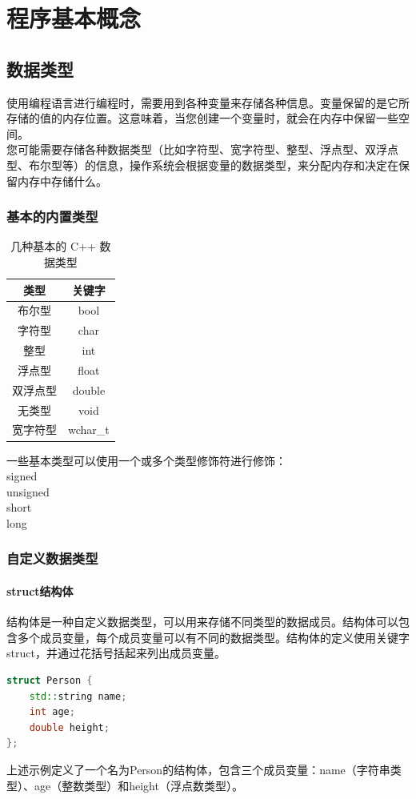 \documentclass[12pt,twiside,a4paper]{ctexbook}
\numberwithin{chapter}{part}
\begin{document}
\chapter{程序基本概念}
\section{数据类型}
使用编程语言进行编程时，需要用到各种变量来存储各种信息。变量保留的是它所存储的值的内存位置。这意味着，当您创建一个变量时，就会在内存中保留一些空间。\\
您可能需要存储各种数据类型（比如字符型、宽字符型、整型、浮点型、双浮点型、布尔型等）的信息，操作系统会根据变量的数据类型，来分配内存和决定在保留内存中存储什么。

\subsection{基本的内置类型}
\begin{table}[h]
    \centering
    \caption{几种基本的 C++ 数据类型}
    \label{tab:example}
    \begin{tabular}{|c|c|}
    \hline
    \textbf{类型} & \textbf{关键字}\\
    \hline
    布尔型 & bool\\
    \hline
    字符型 & char\\
    \hline
    整型 & int\\
    \hline
    浮点型 & float\\
    \hline
    双浮点型 & double\\
    \hline
    无类型 & void\\
    \hline
    宽字符型 & wchar\_t\\
    \hline
    \end{tabular}
\end{table}
一些基本类型可以使用一个或多个类型修饰符进行修饰：\\
signed\\
unsigned\\
short\\
long

\subsection{自定义数据类型}
\subsubsection{struct结构体}
结构体是一种自定义数据类型，可以用来存储不同类型的数据成员。结构体可以包含多个成员变量，每个成员变量可以有不同的数据类型。结构体的定义使用关键字struct，并通过花括号括起来列出成员变量。
\begin{lstlisting}[language=C++]
struct Person {
    std::string name;
    int age;
    double height;
};
\end{lstlisting}
上述示例定义了一个名为Person的结构体，包含三个成员变量：name（字符串类型）、age（整数类型）和height（浮点数类型）。
\end{document}
